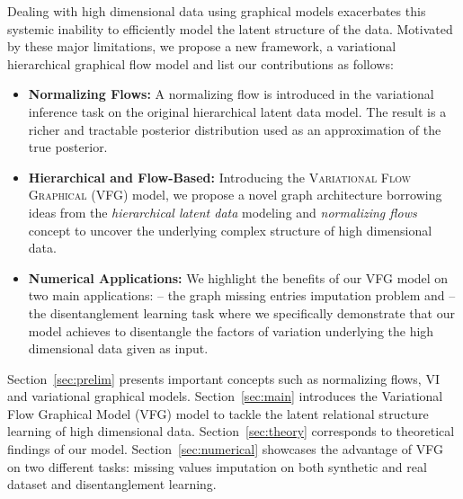 \documentclass{article} %
\newcommand{\belhal}[1]{{\color{red}{\bf\sf [BK: #1]}}}
\begin{document}
Dealing with high dimensional data using graphical models exacerbates this systemic inability to efficiently model the latent structure of the data.
Motivated by these major limitations, we propose a new framework, a variational hierarchical graphical flow model and list our contributions as follows:
\begin{itemize}
    \item \textbf{Normalizing Flows:} A normalizing flow is introduced in the variational inference task on the original hierarchical latent data model. The result is a richer and tractable posterior distribution used as an approximation of the true posterior. 
    \item \textbf{Hierarchical and Flow-Based:} Introducing the \textsc{Variational Flow Graphical (VFG)} model, we propose a novel graph architecture borrowing ideas from the \emph{hierarchical latent data} modeling and \emph{normalizing flows} concept to uncover the underlying complex structure of high dimensional data.
    \item \textbf{Numerical Applications:} We highlight the benefits of our VFG model on two main applications: \textsc{--} the graph missing entries imputation problem and \textsc{--} the disentanglement learning task where we specifically demonstrate that our model achieves to disentangle the factors of variation underlying the high dimensional data given as input.
\end{itemize}

Section~\ref{sec:prelim} presents important concepts such as normalizing flows, VI and variational graphical models.
Section~\ref{sec:main} introduces the Variational Flow Graphical Model (VFG) model to tackle the latent relational structure learning of high dimensional data.
Section~\ref{sec:theory} corresponds to theoretical findings of our model.
Section~\ref{sec:numerical} showcases the advantage of VFG on two different tasks: missing values imputation on both synthetic and real dataset and disentanglement learning.
\end{document}
